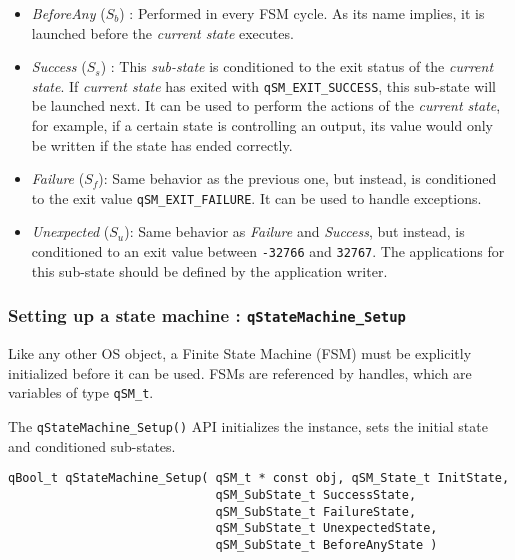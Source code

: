 \begin{itemize}
    \item \textit{BeforeAny} ($S_b$) : Performed in every FSM cycle. As its name implies, it is launched before the \textit{current state} executes. 
    
    \item \textit{Success} ($S_s$) : This \textit{sub-state} is conditioned to the exit status of the \textit{current state}. If \textit{current state} has exited with  \lstinline{qSM_EXIT_SUCCESS}, this sub-state will be launched next. It can be used to perform the actions of the \textit{current state}, for example, if a certain state is controlling an output, its value would only be written if the state has ended correctly.
    
    \item \textit{Failure} ($S_f$): Same behavior as the previous one, but instead, is conditioned to the exit value \lstinline{qSM_EXIT_FAILURE}. It can be used to handle exceptions.
    
    \item \textit{Unexpected} ($S_u$): Same behavior as \textit{Failure} and \textit{Success}, but instead, is conditioned to an exit value between \lstinline{-32766} and \lstinline{32767}. The applications for this sub-state should be defined by the application writer.
\end{itemize}


\subsubsection{Setting up a state machine : \texorpdfstring{\lstinline{qStateMachine_Setup}}{qStateMachine_Setup} }
Like any other OS object, a Finite State Machine (FSM) must be explicitly initialized before it can be used. FSMs are referenced by handles, which are variables of type \lstinline{qSM_t}. 

The \lstinline{qStateMachine_Setup()} API   initializes the instance, sets the initial state and conditioned sub-states.



\begin{lstlisting}[style=CStyle]
qBool_t qStateMachine_Setup( qSM_t * const obj, qSM_State_t InitState,
                             qSM_SubState_t SuccessState, 
                             qSM_SubState_t FailureState, 
                             qSM_SubState_t UnexpectedState, 
                             qSM_SubState_t BeforeAnyState )
\end{lstlisting}

